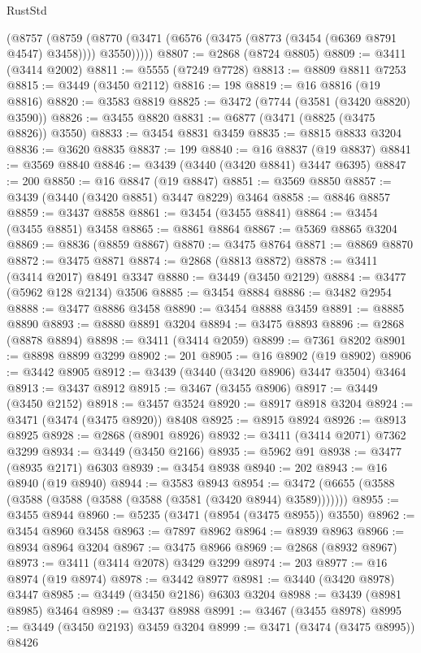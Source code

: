 \begin{lexlean}{RustStd}
\begin{coremodule}
{{{{{{{{{{{{{{{{{{{      (@8757
        (@8759 (@8770 (@3471 (@6576 (@3475 (@8773 (@3454 (@6369 @8791 @4547) @3458)))) @3550)))))
@8807 := @2868 (@8724 @8805)
@8809 := @3411 (@3414 @2002)
@8811 := @5555 (@7249 @7728)
@8813 := @8809 @8811 @7253
@8815 := @3449 (@3450 @2112)
@8816 := 198
@8819 := @16 @8816 (@19 @8816)
@8820 := @3583 @8819
@8825 := @3472 (@7744 (@3581 (@3420 @8820) @3590))
@8826 := @3455 @8820
@8831 := @6877 (@3471 (@8825 (@3475 @8826)) @3550)
@8833 := @3454 @8831 @3459
@8835 := @8815 @8833 @3204
@8836 := @3620 @8835
@8837 := 199
@8840 := @16 @8837 (@19 @8837)
@8841 := @3569 @8840
@8846 := @3439 (@3440 (@3420 @8841) @3447 @6395)
@8847 := 200
@8850 := @16 @8847 (@19 @8847)
@8851 := @3569 @8850
@8857 := @3439 (@3440 (@3420 @8851) @3447 @8229) @3464
@8858 := @8846 @8857
@8859 := @3437 @8858
@8861 := @3454 (@3455 @8841)
@8864 := @3454 (@3455 @8851) @3458
@8865 := @8861 @8864
@8867 := @5369 @8865 @3204
@8869 := @8836 (@8859 @8867)
@8870 := @3475 @8764
@8871 := @8869 @8870
@8872 := @3475 @8871
@8874 := @2868 (@8813 @8872)
@8878 := @3411 (@3414 @2017) @8491 @3347
@8880 := @3449 (@3450 @2129)
@8884 := @3477 (@5962 @128 @2134) @3506
@8885 := @3454 @8884
@8886 := @3482 @2954
@8888 := @3477 @8886 @3458
@8890 := @3454 @8888 @3459
@8891 := @8885 @8890
@8893 := @8880 @8891 @3204
@8894 := @3475 @8893
@8896 := @2868 (@8878 @8894)
@8898 := @3411 (@3414 @2059)
@8899 := @7361 @8202
@8901 := @8898 @8899 @3299
@8902 := 201
@8905 := @16 @8902 (@19 @8902)
@8906 := @3442 @8905
@8912 := @3439 (@3440 (@3420 @8906) @3447 @3504) @3464
@8913 := @3437 @8912
@8915 := @3467 (@3455 @8906)
@8917 := @3449 (@3450 @2152)
@8918 := @3457 @3524
@8920 := @8917 @8918 @3204
@8924 := @3471 (@3474 (@3475 @8920)) @8408
@8925 := @8915 @8924
@8926 := @8913 @8925
@8928 := @2868 (@8901 @8926)
@8932 := @3411 (@3414 @2071) @7362 @3299
@8934 := @3449 (@3450 @2166)
@8935 := @5962 @91
@8938 := @3477 (@8935 @2171) @6303
@8939 := @3454 @8938
@8940 := 202
@8943 := @16 @8940 (@19 @8940)
@8944 := @3583 @8943
@8954 := @3472 (@6655 (@3588 (@3588 (@3588 (@3588 (@3588 (@3581 (@3420 @8944) @3589)))))))
@8955 := @3455 @8944
@8960 := @5235 (@3471 (@8954 (@3475 @8955)) @3550)
@8962 := @3454 @8960 @3458
@8963 := @7897 @8962
@8964 := @8939 @8963
@8966 := @8934 @8964 @3204
@8967 := @3475 @8966
@8969 := @2868 (@8932 @8967)
@8973 := @3411 (@3414 @2078) @3429 @3299
@8974 := 203
@8977 := @16 @8974 (@19 @8974)
@8978 := @3442 @8977
@8981 := @3440 (@3420 @8978) @3447
@8985 := @3449 (@3450 @2186) @6303 @3204
@8988 := @3439 (@8981 @8985) @3464
@8989 := @3437 @8988
@8991 := @3467 (@3455 @8978)
@8995 := @3449 (@3450 @2193) @3459 @3204
@8999 := @3471 (@3474 (@3475 @8995)) @8426
}}}}}}}}}}}}}}}}}}}
\end{coremodule}
\end{lexlean}
